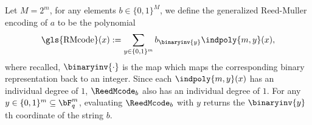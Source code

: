 Let $M = 2^m$, for any elements $b \in \{0,1\}^M$, we define the generalized Reed-Muller encoding of $a$ to be the polynomial
\begin{equation} \label{eq:REM}
	\text{\gls{RMcode}}(x) := \sum_{y \in \{0,1\}^m} b_{\binaryinv{y}} \indpoly{m,y}(x),
\end{equation}
where recalled, $\binaryinv{\cdot}$ is the map which maps the corresponding binary representation back to an integer. Since each $\indpoly{m,y}(x)$ has an individual degree of $1$, $\ReedMcode_b$ also has an individual degree of $1$. For any $y \in \{0,1\}^m \subseteq \bF_q^m$, evaluating $\ReedMcode_b$ with $y$ returns the $\binaryinv{y}$th coordinate of the string $b$.


